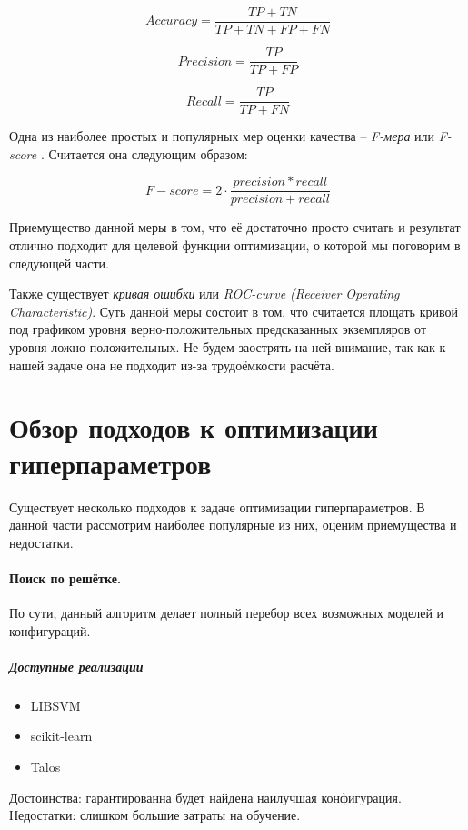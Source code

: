 \documentclass[times,specification,annotation]{itmo-student-thesis}
\begin{document}
	\begin{equation}
	Accuracy = \frac{TP+TN}{TP+TN+FP+FN} 
	\label{eq:accuracy}
	\end{equation}
	
	\begin{equation} 
	Precision = \frac{TP}{TP+FP} 
	\label{eq:precision}
	\end{equation}
	
	\begin{equation}
	Recall =  \frac{TP}{TP+FN}
	\label{eq:recall}
	\end{equation}
	
	Одна из наиболее простых и популярных мер оценки качества -- \textit{F-мера} или \textit{F-score} \cite{powers2015fmeasure}. Считается она следующим образом:
	
	\begin{equation}
 	\mathit{F-score} =  2  \cdot \frac{precision*recall}{precision+recall} 
 	\label{eq:fscore}
	\end{equation}
		
	Приемущество данной меры в том, что её достаточно просто считать и результат отлично подходит для целевой функции оптимизации, о которой мы поговорим в следующей части.\par
	
	Также существует \textit{кривая ошибки} или \textit{ROC-curve (Receiver Operating Characteristic)}. Суть данной меры состоит в том, что считается площать кривой под графиком уровня верно-положительных предсказанных экземпляров от уровня ложно-положительных. Не будем заострять на ней внимание, так как к нашей задаче она не подходит из-за трудоёмкости расчёта. 
	
	
	\section{Обзор подходов к оптимизации гиперпараметров}
	Существует несколько подходов к задаче оптимизации гиперпараметров. В данной части рассмотрим наиболее популярные из них, оценим приемущества и недостатки.
	\paragraph{Поиск по решётке.} По сути, данный алгоритм делает полный перебор всех возможных моделей и конфигураций.
		\subparagraph{Доступные реализации}
		\begin{itemize}
			\item LIBSVM \cite{libsvm}
			\item scikit-learn \cite{scikit-learn}
			\item Talos \cite{talos}
		\end{itemize}
		Достоинства: гарантированна будет найдена наилучшая конфигурация. \\
		Недостатки: слишком большие затраты на обучение.
\end{document}
